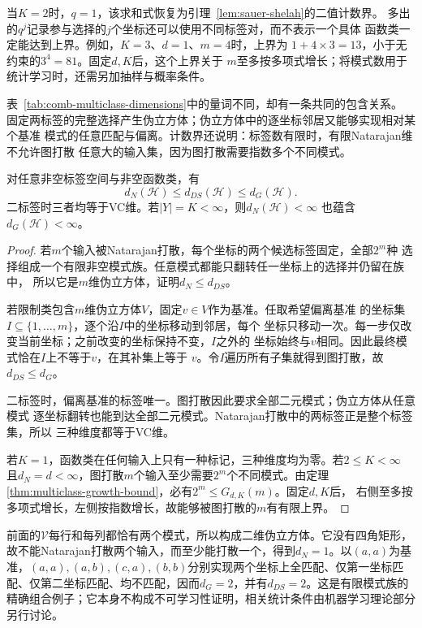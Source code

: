 当\(K=2\)时，\(q=1\)，该求和式恢复为引理~\ref{lem:sauer-shelah}的二值计数界。
多出的\(q^j\)记录参与选择的\(j\)个坐标还可以使用不同标签对，而不表示一个具体
函数类一定能达到上界。例如，\(K=3\)、\(d=1\)、\(m=4\)时，上界为
\(1+4\times3=13\)，小于无约束的\(3^4=81\)。固定\(d,K\)后，这个上界关于
\(m\)至多按多项式增长；将模式数用于统计学习时，还需另加抽样与概率条件。

表~\ref{tab:comb-multiclass-dimensions}中的量词不同，却有一条共同的包含关系。
固定两标签的完整选择产生伪立方体；伪立方体中的逐坐标邻居又能够实现相对某个基准
模式的任意匹配与偏离。计数界还说明：标签数有限时，有限Natarajan维不允许图打散
任意大的输入集，因为图打散需要指数多个不同模式。

\begin{theorem}[多分类维度的比较]
\label{thm:multiclass-dimension-comparison}
对任意非空标签空间与非空函数类，有
\[
  d_N(\mathcal H)\leq d_{DS}(\mathcal H)\leq d_G(\mathcal H).
\]
二标签时三者均等于VC维。若\(|Y|=K<\infty\)，则\(d_N(\mathcal H)<\infty\)
也蕴含\(d_G(\mathcal H)<\infty\)。
\end{theorem}

\begin{proof}
若\(m\)个输入被Natarajan打散，每个坐标的两个候选标签固定，全部\(2^m\)种
选择组成一个有限非空模式族。任意模式都能只翻转任一坐标上的选择并仍留在族中，
所以它是\(m\)维伪立方体，证明\(d_N\leq d_{DS}\)。

若限制类包含\(m\)维伪立方体\(V\)，固定\(v\in V\)作为基准。任取希望偏离基准
的坐标集\(I\subseteq\{1,\ldots,m\}\)，逐个沿\(I\)中的坐标移动到邻居，每个
坐标只移动一次。每一步仅改变当前坐标；之前改变的坐标保持不变，\(I\)之外的
坐标始终与\(v\)相同。因此最终模式恰在\(I\)上不等于\(v\)，在其补集上等于
\(v\)。令\(I\)遍历所有子集就得到图打散，故\(d_{DS}\leq d_G\)。

二标签时，偏离基准的标签唯一。图打散因此要求全部二元模式；伪立方体从任意模式
逐坐标翻转也能到达全部二元模式。Natarajan打散中的两标签正是整个标签集，所以
三种维度都等于VC维。

若\(K=1\)，函数类在任何输入上只有一种标记，三种维度均为零。若\(2\leq K<\infty\)
且\(d_N=d<\infty\)，图打散\(m\)个输入至少需要\(2^m\)个不同模式。由定理~
\ref{thm:multiclass-growth-bound}，必有\(2^m\leq G_{d,K}(m)\)。固定\(d,K\)后，
右侧至多按多项式增长，左侧按指数增长，故能够被图打散的\(m\)有有限上界。
\end{proof}

前面的\(\mathcal V\)每行和每列都恰有两个模式，所以构成二维伪立方体。它没有四角矩形，故不能Natarajan打散两个输入，而至少能打散一个，得到\(d_N=1\)。以\((a,a)\)为基准，\((a,a),(a,b),(c,a),(b,b)\)分别实现两个坐标上全匹配、仅第一坐标匹配、仅第二坐标匹配、均不匹配，因而\(d_G=2\)，并有\(d_{DS}=2\)。这是有限模式族的精确组合例子；它本身不构成不可学习性证明，相关统计条件由机器学习理论部分另行讨论。

